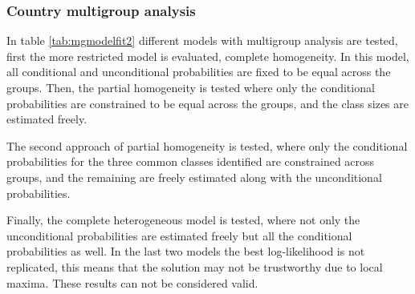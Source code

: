 \documentclass[12pt,a4paper,oneside]{reedthesis}
\begin{document}
\newpage

\hypertarget{country-multigroup-analysis-1}{%
\subsubsection{Country multigroup analysis}\label{country-multigroup-analysis-1}}

In table \ref{tab:mgmodelfit2} different models with multigroup analysis are tested, first the more restricted model is evaluated, complete homogeneity. In this model, all conditional and unconditional probabilities are fixed to be equal across the groups. Then, the partial homogeneity is tested where only the conditional probabilities are constrained to be equal across the groups, and the class sizes are estimated freely.

The second approach of partial homogeneity is tested, where only the conditional probabilities for the three common classes identified are constrained across groups, and the remaining are freely estimated along with the unconditional probabilities.

Finally, the complete heterogeneous model is tested, where not only the unconditional probabilities are estimated freely but all the conditional probabilities as well. In the last two models the best log-likelihood is not replicated, this means that the solution may not be trustworthy due to local maxima. These results can not be considered valid.
\end{document}
